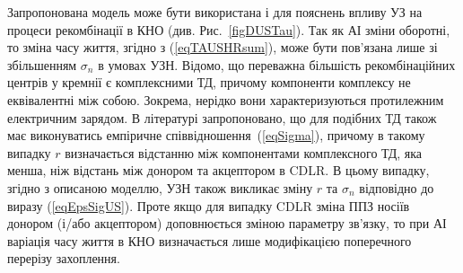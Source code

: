 Запропонована модель може бути використана і для пояснень впливу УЗ на процеси рекомбінації в КНО (див. Рис.~\ref{figDUSTau}).
Так як АІ зміни оборотні, то зміна часу життя, згідно з (\ref{eqTAUSHRsum}), може бути пов'язана лише зі збільшенням
$\sigma_n$ в умовах УЗН.
Відомо, що переважна більшість рекомбінаційних центрів у кремнії є комплексними ТД,
причому компоненти комплексу не еквівалентні між собою.
Зокрема, нерідко вони характеризуються протилежним електричним зарядом.
В літературі \cite{CDLR:R2} запропоновано, що для подібних ТД також має виконуватись емпіричне співвідношення~(\ref{eqSigma}),
причому в такому випадку $r$ визначається відстанню між компонентами комплексного ТД, яка  менша, ніж відстань між донором та акцептором в CDLR.
В цьому випадку, згідно з описаною моделлю, УЗН також викликає зміну $r$ та $\sigma_n$ відповідно до виразу (\ref{eqEpsSigUS}).
Проте якщо для випадку CDLR зміна ППЗ носіїв донором (і/або акцептором) доповнюється зміною параметру зв'язку,
то при АІ варіація часу життя в КНО визначається лише модифікацією поперечного перерізу захоплення.

